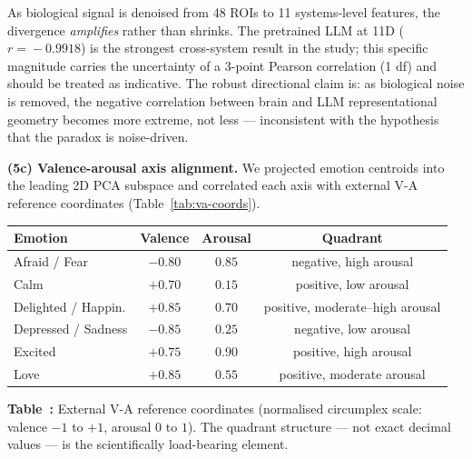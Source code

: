 \documentclass{article}
\begin{document}
As biological signal is denoised from 48 ROIs to 11 systems-level features, the
divergence \emph{amplifies} rather than shrinks.
The pretrained LLM at 11D ($r\!=\!-0.9918$) is the strongest cross-system result in
the study; this specific magnitude carries the uncertainty of a 3-point Pearson
correlation (1 df) and should be treated as indicative.
The robust directional claim is: as biological noise is removed, the negative
correlation between brain and LLM representational geometry becomes more extreme,
not less --- inconsistent with the hypothesis that the paradox is noise-driven.

\textbf{(5c) Valence-arousal axis alignment.}
We projected emotion centroids into the leading 2D PCA subspace and correlated each
axis with external V-A reference coordinates (Table~\ref{tab:va-coords}).

\vspace{0.4em}
\noindent{}\label{tab:va-coords}%
\begin{center}
\small
\begin{tabular}{lccc}
\toprule
Emotion & Valence & Arousal & Quadrant \\
\midrule
Afraid / Fear       & $-0.80$ & $0.85$ & negative, high arousal \\
Calm                & $+0.70$ & $0.15$ & positive, low arousal \\
Delighted / Happin. & $+0.85$ & $0.70$ & positive, moderate--high arousal \\
Depressed / Sadness & $-0.85$ & $0.25$ & negative, low arousal \\
Excited             & $+0.75$ & $0.90$ & positive, high arousal \\
Love                & $+0.85$ & $0.55$ & positive, moderate arousal \\
\bottomrule
\end{tabular}
\par\vspace{0.3em}
{\small\textbf{Table~\thetable:} External V-A reference coordinates (normalised
circumplex scale: valence $-1$ to $+1$, arousal $0$ to $1$).
The quadrant structure --- not exact decimal values --- is the
scientifically load-bearing element.}
\end{center}
\vspace{0.3em}
\end{document}
